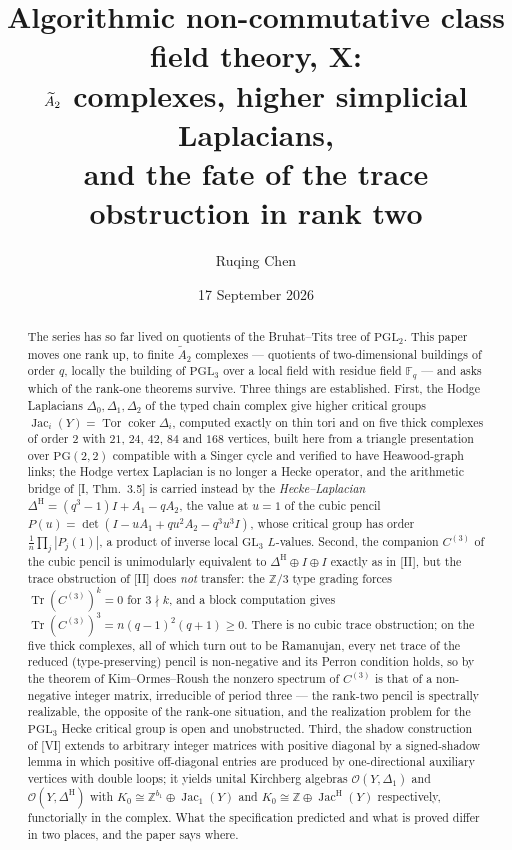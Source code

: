 \documentclass[11pt]{amsart}
\title[Algorithmic non-commutative class field theory, X]
{Algorithmic non-commutative class field theory, X:\\
$\Atwo$ complexes, higher simplicial Laplacians,\\ and the fate of the trace obstruction in
rank two}
\author{Ruqing Chen}
\date{17 September 2026}
\numberwithin{equation}{section}
\theoremstyle{definition}
\theoremstyle{remark}
\newcommand{\Z}{\mathbb{Z}}
\newcommand{\F}{\mathbb{F}}
\newcommand{\cO}{\mathcal{O}}
\newcommand{\Jac}{\operatorname{Jac}}
\newcommand{\coker}{\operatorname{coker}}
\newcommand{\Tor}{\operatorname{Tor}}
\newcommand{\Tr}{\operatorname{Tr}}
\newcommand{\PGL}{\mathrm{PGL}}
\newcommand{\PG}{\mathrm{PG}}
\newcommand{\Atwo}{\widetilde A_2}
\newcommand{\DeltaH}{\Delta^{\mathrm{H}}}
\newcommand{\JacH}{\Jac^{\mathrm{H}}}
\newcommand{\Cthree}{C^{(3)}}
\begin{document}
\begin{abstract}
The series has so far lived on quotients of the Bruhat--Tits tree of $\PGL_2$. This paper
moves one rank up, to finite $\Atwo$ complexes --- quotients of two-dimensional buildings of
order $q$, locally the building of $\PGL_3$ over a local field with residue field $\F_q$ ---
and asks which of the rank-one theorems survive. Three things are established. First, the
Hodge Laplacians $\Delta_0,\Delta_1,\Delta_2$ of the typed chain complex give higher
critical groups $\Jac_i(Y)=\Tor\coker\Delta_i$, computed exactly on thin tori and on five
thick complexes of order $2$ with $21$, $24$, $42$, $84$ and $168$ vertices, built here from
a triangle presentation over $\PG(2,2)$ compatible with a Singer cycle and verified to have
Heawood-graph links; the Hodge vertex Laplacian is no longer a Hecke operator, and the
arithmetic bridge of [I, Thm.~3.5] is carried instead by the \emph{Hecke--Laplacian}
$\DeltaH=(q^{3}-1)I+A_1-qA_2$, the value at $u=1$ of the cubic pencil
$P(u)=\det(I-uA_1+qu^{2}A_2-q^{3}u^{3}I)$, whose critical group has order
$\frac1n\prod_j|P_j(1)|$, a product of inverse local $\mathrm{GL}_3$ $L$-values. Second,
the companion $\Cthree$ of the cubic pencil is unimodularly equivalent to $\DeltaH\oplus I\oplus I$
exactly as in [II], but the trace obstruction of [II] does \emph{not} transfer: the $\Z/3$
type grading forces $\Tr(\Cthree)^{k}=0$ for $3\nmid k$, and a block computation gives
$\Tr(\Cthree)^{3}=n(q-1)^{2}(q+1)\ge0$. There is no cubic trace obstruction; on the five
thick complexes, all of which turn out to be Ramanujan, every net trace of the reduced
(type-preserving) pencil is non-negative and its Perron condition holds, so by the theorem
of Kim--Ormes--Roush the nonzero spectrum of $\Cthree$ is that of a non-negative integer
matrix, irreducible of period three --- the rank-two pencil is spectrally realizable, the
opposite of the rank-one situation, and the realization problem for the $\PGL_3$ Hecke
critical group is open and unobstructed. Third, the shadow construction of [VI] extends to
arbitrary
integer matrices with positive diagonal by a signed-shadow lemma in which positive
off-diagonal entries are produced by one-directional auxiliary vertices with double loops;
it yields unital Kirchberg algebras $\cO(Y,\Delta_1)$ and $\cO(Y,\DeltaH)$ with
$K_0\cong\Z^{b_1}\oplus\Jac_1(Y)$ and $K_0\cong\Z\oplus\JacH(Y)$ respectively, functorially
in the complex. What the specification predicted and what is proved differ in two places,
and the paper says where.
\end{abstract}
\end{document}
